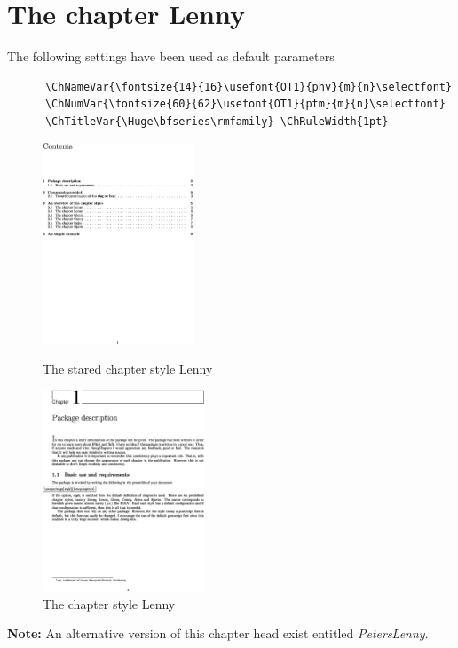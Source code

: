 \documentclass{report}
\begin{document}
    \section{The chapter Lenny}
    The following settings have been used as default parameters
    {\small\begin{verbatim}
      \ChNameVar{\fontsize{14}{16}\usefont{OT1}{phv}{m}{n}\selectfont}
      \ChNumVar{\fontsize{60}{62}\usefont{OT1}{ptm}{m}{n}\selectfont}
      \ChTitleVar{\Huge\bfseries\rmfamily} \ChRuleWidth{1pt}
    \end{verbatim}}
    \begin{figure}[h]
      \begin{minipage}{7 cm}
        \centerline{\includegraphics[height=6cm]{Lennys.eps}} 
        \caption{The stared chapter style Lenny}
      \end{minipage}\hfill
      \begin{minipage}{7 cm}
        \centerline{\includegraphics[height=6cm]{Lenny.eps}}
        \caption{The chapter style Lenny}
      \end{minipage}\hfill
    \end{figure}
\textbf{Note:} An alternative version of this chapter head exist
entitled \textsl{PetersLenny}.
\end{document}
